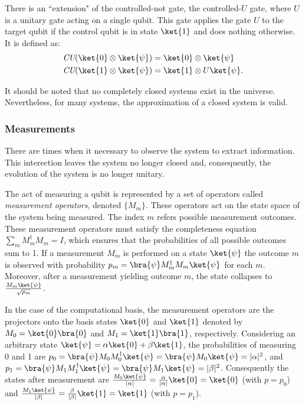 There is an ``extension" of the controlled-not gate, the controlled-$U$ gate, where $U$ is a unitary gate acting on a single qubit. This gate applies the gate $U$ to the target qubit if the control qubit is in state $\ket{1}$ and does nothing otherwise. It is defined as:
\begin{align*}
  &\textit{CU} (\ket{0} \otimes \ket{\psi}) = \ket{0} \otimes \ket{\psi}\\ 
  &\textit{CU} (\ket{1} \otimes \ket{\psi}) = \ket{1} \otimes U\ket{\psi}.
\end{align*}

It should be noted that no completely closed systems exist in the universe. Nevertheless, for many systems, the approximation of a closed system is valid.



\subsubsection{Measurements}


There are times when it necessary to observe the system to extract information. This interection leaves the system no longer closed and, consequently, the evolution of the system is no longer unitary. 

The act of measuring a qubit is represented by a set of operators called \emph{measurement operators}, denoted $\{M_{m}\}$. These operators act on the state space  of the system being measured. The index $m$ refers possible measurement outcomes. These measurement operators must satisfy the completeness equation $\sum_{m} M_{m}^{\dagger}M_{m} = I$, which ensures that the probabilities of all possible outcomes sum to 1. If a measurement ${M_m}$ is performed on a state $\ket{\psi}$ the outcome $m$ is observed with probability $p_m = \bra{\psi}M_{m}^{\dagger}M_{m}\ket{\psi}$ for each $m$. Moreover, after a measurement yielding outcome $m$, the state collapses to $\frac{M_{m}\ket{\psi}}{\sqrt{p_{m}}}$. 

In the case of the computational basis, the measurement operators are the projectors onto the basis states $\ket{0}$ and $\ket{1}$ denoted by $M_{0} = \ket{0}\bra{0}$ and $M_{1} = \ket{1}\bra{1}$, respectively. Considering an arbitrary state $\ket{\psi} = \alpha \ket{0} + \beta \ket{1}$, the probabilities of measuring 0 and 1 are $p_0 = \bra{\psi} M_{0} M_{0}^{\dag}\ket{\psi}=\bra{\psi} M_{0} \ket{\psi} = |\alpha|^{2}$, and $p_1 = \bra{\psi} M_{1} M_{1}^{\dag}\ket{\psi} = \bra{\psi} M_{1} \ket{\psi} =  |\beta|^{2} $. Consequently the states after measurement are $\frac{M_{0}\ket{\psi}} {|\alpha|} = \frac{\alpha}{|\alpha|} \ket{0} = \ket{0}$ (with $p=p_0$) and $\frac{M_{1}\ket{\psi}} {|\beta|} = \frac{\beta}{|\beta|} \ket{1} = \ket{1}$ (with $p=p_1$).


